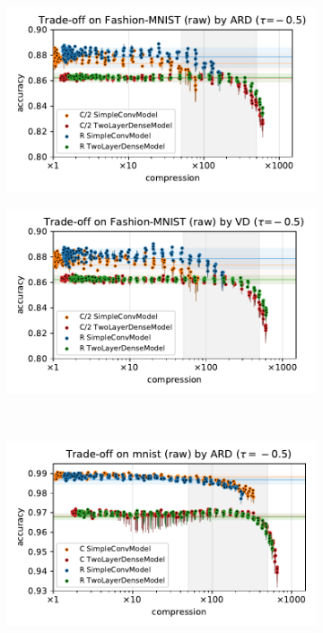 \documentclass[a4paper,10pt,onecolumn]{article}
\begin{document}
\begin{figure}[b]
\begin{subfigure}[b]{0.5\columnwidth}
    \centering
    \includegraphics[width=\columnwidth]{figure__mnist-like__trade-off/appendix__cmp__ARD__fashionmnist__raw__-0.5.pdf}
  \end{subfigure}%
  \begin{subfigure}[b]{0.5\columnwidth}
    \centering
    \includegraphics[width=\columnwidth]{figure__mnist-like__trade-off/appendix__cmp__VD__fashionmnist__raw__-0.5.pdf}
  \end{subfigure} \\ %
  \begin{subfigure}[b]{0.5\columnwidth}
    \centering
    \includegraphics[width=\columnwidth]{figure__mnist-like__trade-off/appendix__ARD__mnist__raw__-0.5.pdf}

\end{subfigure}
\end{figure}
\end{document}

